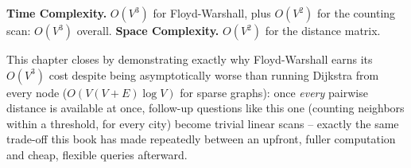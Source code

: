 \begin{complexitybox}
\textbf{Time Complexity.} $O(V^3)$ for Floyd-Warshall, plus $O(V^2)$
for the counting scan: $O(V^3)$ overall.
\textbf{Space Complexity.} $O(V^2)$ for the distance matrix.
\end{complexitybox}

\begin{takeawaybox}
This chapter closes by demonstrating exactly why Floyd-Warshall earns
its $O(V^3)$ cost despite being asymptotically worse than running
Dijkstra from every node ($O(V(V+E)\log V)$ for sparse graphs): once
\emph{every} pairwise distance is available at once, follow-up
questions like this one (counting neighbors within a threshold, for
every city) become trivial linear scans -- exactly the same trade-off
this book has made repeatedly between an upfront, fuller computation
and cheap, flexible queries afterward.
\end{takeawaybox}
